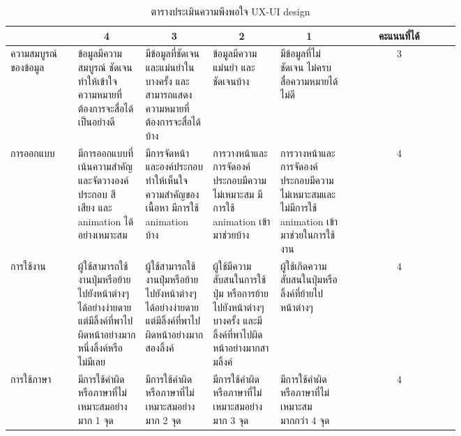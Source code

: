 \begin{table}[H]
    \caption{ตารางประเมินความพึงพอใจ UX-UI design}\label{tbl:uxuieva}
    \begin{tabular}{|p{0.15\linewidth}|p{0.15\linewidth}|p{0.15\linewidth}|p{0.15\linewidth}|p{0.15\linewidth}|c|}
    \hline
                         & \multicolumn{1}{c|}{4}                                                                                                 & \multicolumn{1}{c|}{3}                                                                                   & \multicolumn{1}{c|}{2}                                                                                        & \multicolumn{1}{c|}{1}                                                                        & คะแนนที่ได้ \\ \hline
    ความสมบูรณ์ของข้อมูล    & ข้อมูลมีความสมบูรณ์   ชัดเจนทำให้เข้าใจความหมายที่ต้องการจะสื่อได้เป็นอย่างดี                                          & มีข้อมูลที่ชัดเจน   และแม่นยำในบางครั้ง และสามารถแสดงความหมายที่ต้องการจะสื่อได้บ้าง                     & ข้อมูลมีความแม่นยำ   และชัดเจนบ้าง                                                                            & มีข้อมูลที่ไม่ชัดเจน   ไม่ครบ สื่อความหมายได้ไม่ดี                                            & 3           \\ \hline
    การออกแบบ            & มีการออกแบบที่เน้นความสำคัญและจัดวางองค์ประกอบ   สี เสียง และ animation ได้อย่างเหมาะสม                                & มีการจัดหน้า   และองค์ประกอบทำให้เห็นใจความสำคัญของเนื้อหา มีการใช้ animation   บ้าง                     & การวางหน้าและการจัดองค์ประกอบมีความไม่เหมาะสม   มีการใช้ animation เข้ามาช่วยบ้าง                             & การวางหน้าและการจัดองค์ประกอบมีความไม่เหมาะสมและไม่มีการใช้   animation เข้ามาช่วยในการใช้งาน & 4           \\ \hline
    การใช้งาน              & ผู้ใช้สามารถใช้งานปุ่มหรือย้ายไปยังหน้าต่างๆได้อย่างง่ายดาย   แต่มีลิ้งค์ที่พาไปผิดหน้าอย่างมากหนึ่งลิ้งค์หรือไม่มีเลย & ผู้ใช้สามารถใช้งานปุ่มหรือย้ายไปยังหน้าต่างๆได้อย่างง่ายดาย   แต่มีลิ้งค์ที่พาไปผิดหน้าอย่างมากสองลิ้งค์ & ผู้ใช้มีความสับสนในการใช้ปุ่ม   หรือการย้ายไปยังหน้าต่างๆ บางครั้ง และมีลิ้งค์ที่พาไปผิดหน้าอย่างมากสามลิ้งค์ & ผู้ใช้เกิดความสับสนในปุ่มหรือลิ้งค์ที่ย้ายไปหน้าต่างๆ                                         & 4           \\ \hline
    การใช้ภาษา            & มีการใช้คำผิดหรือภาษาที่ไม่เหมาะสมอย่างมาก   1 จุด                                                                     & มีการใช้คำผิดหรือภาษาที่ไม่เหมาะสมอย่างมาก   2 จุด                                                       & มีการใช้คำผิดหรือภาษาที่ไม่เหมาะสมอย่างมาก 3 จุด                                                              & มีการใช้คำผิดหรือภาษาที่ไม่เหมาะสมมากกว่า 4 จุด                                               & 4           \\ \hline
    \end{tabular}
    \end{table}

